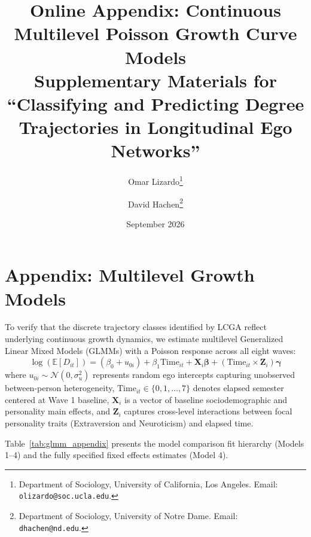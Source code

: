 \documentclass[12pt]{article}
\title{Online Appendix: Continuous Multilevel Poisson Growth Curve Models\\
\large Supplementary Materials for ``Classifying and Predicting Degree Trajectories in Longitudinal Ego Networks''}
\author{
  Omar Lizardo\thanks{Department of Sociology, University of California, Los Angeles. Email: \texttt{olizardo@soc.ucla.edu}.}
  \and
  David Hachen\thanks{Department of Sociology, University of Notre Dame. Email: \texttt{dhachen@nd.edu}.}
}
\date{September 2026}
\begin{document}
\maketitle

\renewcommand{\thetable}{A\arabic{table}}
\renewcommand{\thefigure}{A\arabic{figure}}
\setcounter{table}{0}
\setcounter{figure}{0}

\section*{Appendix: Multilevel Growth Models}

To verify that the discrete trajectory classes identified by LCGA reflect underlying continuous growth dynamics, we estimate multilevel Generalized Linear Mixed Models (GLMMs) with a Poisson response across all eight waves:
\begin{equation}
\label{eq:glmm_full}
\log(\mathbb{E}[D_{it}]) = (\beta_0 + u_{0i}) + \beta_1 \text{Time}_{it} + \mathbf{X}_i \boldsymbol{\beta} + (\text{Time}_{it} \times \mathbf{Z}_i) \boldsymbol{\gamma}
\end{equation}
where $u_{0i} \sim \mathcal{N}(0, \sigma_u^2)$ represents random ego intercepts capturing unobserved between-person heterogeneity, $\text{Time}_{it} \in \{0, 1, \dots, 7\}$ denotes elapsed semester centered at Wave 1 baseline, $\mathbf{X}_i$ is a vector of baseline sociodemographic and personality main effects, and $\mathbf{Z}_i$ captures cross-level interactions between focal personality traits (Extraversion and Neuroticism) and elapsed time.

Table~\ref{tab:glmm_appendix} presents the model comparison fit hierarchy (Models 1--4) and the fully specified fixed effects estimates (Model 4).
\end{document}
